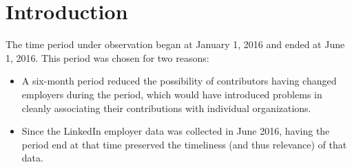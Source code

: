 \chapter{Introduction}
The time period \timeperiod{} under observation began at January 1, 2016 and ended at June 1, 2016. This period was chosen for two reasons:
\begin{itemize}
	\item A six-month period reduced the possibility of contributors having changed employers during the period, which would have introduced problems in cleanly associating their contributions with individual organizations.
	\item Since the LinkedIn employer data was collected in June 2016, having the period end at that time preserved the timeliness (and thus relevance) of that data.
\end{itemize}
\cite{mockus2002two}